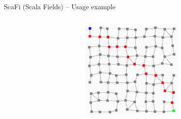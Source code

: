 \documentclass[presentation, 9pt]{beamer}\mode<presentation>{\usetheme{AMSBolognaFC}}
\begin{document}
\begin{frame}{ScaFi (Scala Fields) -- Usage example \href{https://github.com/cric96/spark-mini-example}{\faLink}}
\begin{columns}
\begin{column}[c]{0.4\textwidth}
	\end{column}
	\begin{column}[c]{0.4\textwidth}
		\includegraphics[width=5cm]{img/channel.png}
	\end{column}
\end{columns}
\end{frame}
\end{document}
